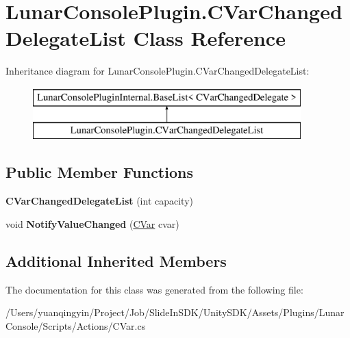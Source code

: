 \hypertarget{class_lunar_console_plugin_1_1_c_var_changed_delegate_list}{}\section{Lunar\+Console\+Plugin.\+C\+Var\+Changed\+Delegate\+List Class Reference}
\label{class_lunar_console_plugin_1_1_c_var_changed_delegate_list}
Inheritance diagram for Lunar\+Console\+Plugin.\+C\+Var\+Changed\+Delegate\+List\+:\begin{figure}[H]
\begin{center}
\leavevmode
\includegraphics[height=2.000000cm]{class_lunar_console_plugin_1_1_c_var_changed_delegate_list}
\end{center}
\end{figure}
\subsection*{Public Member Functions}
\begin{DoxyCompactItemize}
\item 
\mbox{\label{class_lunar_console_plugin_1_1_c_var_changed_delegate_list_a84f5b3c82559204ea9307fd588bed1a2}} 
{\bfseries C\+Var\+Changed\+Delegate\+List} (int capacity)
\item 
\mbox{\label{class_lunar_console_plugin_1_1_c_var_changed_delegate_list_ae1a8ff66273b89a4ec19cba09c83e169}} 
void {\bfseries Notify\+Value\+Changed} (\mbox{\hyperlink{class_lunar_console_plugin_1_1_c_var}{C\+Var}} cvar)
\end{DoxyCompactItemize}
\subsection*{Additional Inherited Members}


The documentation for this class was generated from the following file\+:\begin{DoxyCompactItemize}
\item 
/\+Users/yuanqingyin/\+Project/\+Job/\+Slide\+In\+S\+D\+K/\+Unity\+S\+D\+K/\+Assets/\+Plugins/\+Lunar\+Console/\+Scripts/\+Actions/C\+Var.\+cs\end{DoxyCompactItemize}
